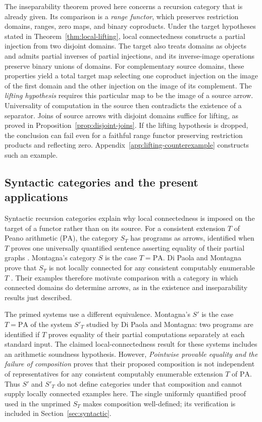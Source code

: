 \documentclass[11pt]{article}
\newcommand{\PA}{\mathrm{PA}}
\begin{document}
The inseparability theorem proved here concerns a recursion category
that is already given. Its comparison is a \emph{range functor},
which preserves restriction domains, ranges, zero maps, and binary
coproducts. Under the target hypotheses stated in
Theorem~\ref{thm:local-lifting}, local connectedness constructs a
partial injection from two disjoint domains. The target also treats
domains as objects and admits partial inverses of partial injections, and its
inverse-image operations preserve binary unions of domains.
For complementary source domains, these properties yield a total
target map selecting one coproduct injection on the image of the
first domain and the other injection on the image of its complement.
The \emph{lifting hypothesis} requires this particular map to be the
image of a source arrow. Universality of computation in the source
then contradicts the existence of a separator.
Joins of source arrows with disjoint domains suffice for lifting,
as proved in Proposition~\ref{prop:disjoint-joins}.
If the lifting hypothesis is dropped, the conclusion can fail even
for a faithful range functor preserving restriction products and
reflecting zero. Appendix~\ref{app:lifting-counterexample} constructs
such an example.

\subsection{Syntactic categories and the present applications}

Syntactic recursion categories explain why local connectedness is
imposed on the target of a functor rather than on its source.
For a consistent extension $T$ of Peano arithmetic ($\PA$), the category
$S_T$ has programs as arrows, identified when $T$ proves one
universally quantified sentence asserting equality of their partial
graphs \cite{Montagna,DPM}. Montagna's category $S$ is the case
$T=\PA$. Di Paola and Montagna prove that $S_T$ is not locally
connected for any consistent computably enumerable $T$
\cite[Corollary 4.4]{DPM}. Their examples therefore motivate
comparison with a category in which connected domains do determine
arrows, as in the existence and inseparability results just described.

The primed systems use a different equivalence. Montagna's $S'$ is
the case $T=\PA$ of the system $S'_T$ studied by Di Paola and
Montagna: two programs are identified if $T$ proves equality of their
partial computations separately at each standard input.
The claimed local-connectedness result for these systems
\cite[Theorem 4.5, pp.~658--659]{DPM} includes an arithmetic
soundness hypothesis. However, \emph{Pointwise provable equality and
the failure of composition} \cite[Corollary 2]{Composition} proves
that their proposed composition is not independent of representatives
for any consistent computably enumerable extension $T$ of $\PA$.
Thus $S'$ and $S'_T$ do not define categories under that composition
and cannot supply locally connected examples here.
The single uniformly quantified proof used in the unprimed $S_T$
makes composition well-defined; its verification is included in
Section~\ref{sec:syntactic}.
\end{document}

